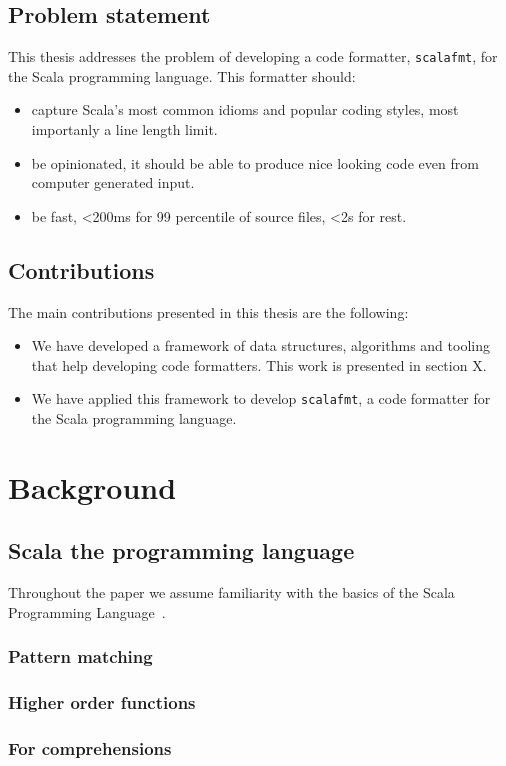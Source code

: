 \documentclass[11pt,a4paper]{article}
\newcommand{\scalafmt}{\texttt{scalafmt}}
\begin{document}
\subsection{Problem statement}
This thesis addresses the problem of developing a code formatter, \scalafmt, for the Scala programming language.
This formatter should:
\begin{itemize}
  \item capture Scala's most common idioms and popular coding styles, most importanly a line length limit.
  \item be opinionated, it should be able to produce nice looking code even from computer generated input.
  \item be fast, <200ms for 99 percentile of source files, <2s for rest.
\end{itemize}

\subsection{Contributions}
The main contributions presented in this thesis are the following:
\begin{itemize}
    \item We have developed a framework of data structures, algorithms and tooling that help
      developing code formatters. This work is presented in section X.
    \item We have applied this framework to develop \scalafmt, a code
      formatter for the Scala programming language.
\end{itemize}

\section{Background}
\subsection{Scala the programming language}
Throughout the paper we assume familiarity with the basics of the Scala
Programming Language~\autocite{odersky_scala_2004}.
\subsubsection{Pattern matching}
\subsubsection{Higher order functions}
\subsubsection{For comprehensions}
\end{document}
